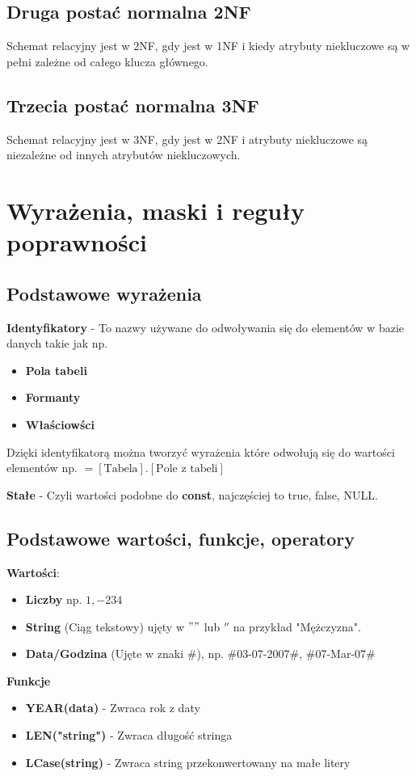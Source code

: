 \documentclass[12pt, a4paper]{article}
\begin{document}
\subsection*{Druga postać normalna 2NF}
Schemat relacyjny jest w 2NF, gdy jest w 1NF i kiedy atrybuty niekluczowe są
w pełni zależne od całego klucza głównego.
\subsection*{Trzecia postać normalna 3NF}
Schemat relacyjny jest w 3NF, gdy jest w 2NF i atrybuty niekluczowe są niezależne od innych
atrybutów niekluczowych.
\section{Wyrażenia, maski i reguły poprawności}
\subsection*{Podstawowe wyrażenia}
\textbf{Identyfikatory} - To nazwy używane do odwoływania się do elementów w bazie danych takie jak np.
\begin{itemize}
  \item \textbf{Pola tabeli}
  \item \textbf{Formanty}
  \item \textbf{Właściowści}
\end{itemize}
Dzięki identyfikatorą można tworzyć wyrażenia które odwołują się do wartości elementów np.
$= [\text{Tabela}].[\text{Pole z tabeli}]$
\vspace{1em}

\textbf{Stałe} - Czyli wartości podobne do \textbf{const}, najczęściej to true, false, NULL.
\subsection*{Podstawowe wartości, funkcje, operatory}
\textbf{Wartości}:
\begin{itemize}
  \item \textbf{Liczby} np. $1, -234$
  \item \textbf{String} (Ciąg tekstowy) ujęty w $""$ lub $''$ na przykład "Mężczyzna".
  \item \textbf{Data/Godzina} (Ujęte w znaki \#), np. \#03-07-2007\#, \#07-Mar-07\#
\end{itemize}
\vspace{1em}

\textbf{Funkcje}
\begin{itemize}
  \item \textbf{YEAR(data)} - Zwraca rok z daty
  \item \textbf{LEN("string")} - Zwraca długość stringa
  \item \textbf{LCase(string)} - Zwraca string przekonwertowany na małe litery
\end{itemize}
\vspace{1em}
\end{document}

